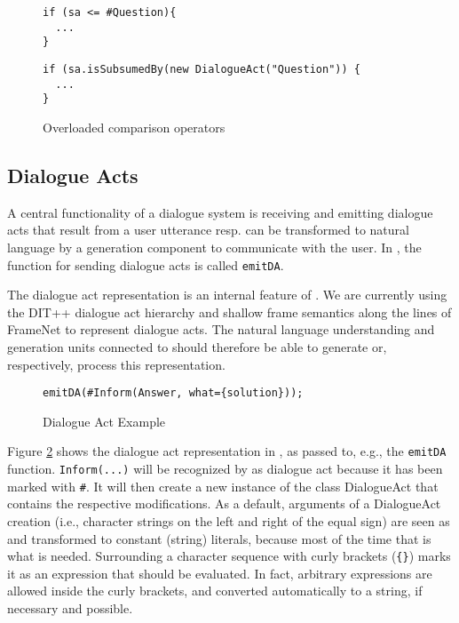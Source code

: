 \begin{figure}[htbp]
\centering
{\footnotesize%
\begin{minipage}{0.28\textwidth}
\begin{lstlisting}
if (sa <= #Question){
  ...
}
\end{lstlisting}
\end{minipage}\vline\hspace{1em}
\begin{minipage}{0.6\textwidth}
\begin{lstlisting}
if (sa.isSubsumedBy(new DialogueAct("Question")) {
  ...
}
\end{lstlisting}
\end{minipage}}\vspace*{-2ex}
\caption{\label{tab:overloaded-comparison}Overloaded comparison operators}
\end{figure}

\subsection{Dialogue Acts}
\label{sec:caret}

A central functionality of a dialogue system is receiving and emitting dialogue
acts that result from a user utterance resp. can be transformed to natural
language by a generation component to communicate with the user. In \vonda,
the function for sending dialogue acts is called \texttt{emitDA}.

The dialogue act representation is an internal feature of \vonda. We are
currently using the DIT++ dialogue act hierarchy \citep{bunt2012iso} and
shallow frame semantics along the lines of FrameNet
\citep{ruppenhofer2016framenet} to represent dialogue acts. The natural
language understanding and generation units connected to \vonda should
therefore be able to generate or, respectively, process this representation.

\begin{figure}[htb]
  \centering\small\texttt{emitDA(\#Inform(Answer, what=\{solution\}));}
  \vspace*{-1ex}\caption{\label{fig:DA}Dialogue Act Example}
\end{figure}

Figure \ref{fig:DA} shows the dialogue act representation in \vonda, as passed
to, e.g., the \texttt{emitDA} function. \texttt{Inform}\verb|(...)| will be
recognized by \vonda as dialogue act because it has been marked with
\verb|#|. It will then create a new instance of the class DialogueAct that
contains the respective modifications. As a default, arguments of a DialogueAct
creation (i.e., character strings on the left and right of the equal sign) are
seen as and transformed to constant (string) literals, because most of the time
that is what is needed.  Surrounding a character sequence with curly brackets
(\texttt{\{\}}) marks it as an expression that should be evaluated. In fact,
arbitrary expressions are allowed inside the curly brackets, and converted
automatically to a string, if necessary and possible.

